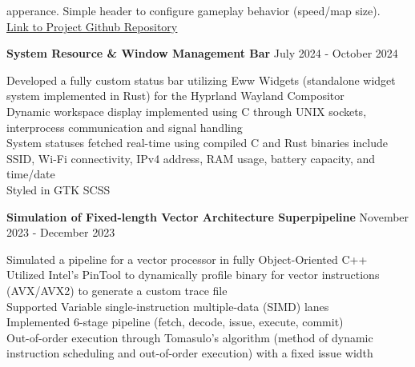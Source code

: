 \documentclass[letter,12pt]{article}
\begin{document}
apperance.
\textbullet \- Simple header to configure gameplay behavior (speed/map size).\\
\textbullet \- {\color{cyan}\underline{\href{https://github.com/DMGDy/termios-snake}{Link to Project Github Repository}}}
\begin{tcolorbox}
[colback=gray!25,
  leftrule=0pt,
  rightrule=0pt,
  sharp corners]
\noindent\textbf{System Resource \& Window Management Bar}
\hfill July 2024 - October 2024
\end{tcolorbox}
\noindent
\textbullet \- Developed a fully custom status bar utilizing Eww Widgets 
(standalone widget system implemented in Rust) for the Hyprland Wayland 
Compositor\\
\textbullet \- Dynamic workspace display implemented using C through UNIX sockets, interprocess 
communication and signal handling\\
\textbullet \- System statuses fetched real-time using compiled C and Rust binaries include
SSID, Wi-Fi connectivity, IPv4 address, RAM usage, battery capacity, and time/date\\
\textbullet \- Styled in GTK SCSS \\
\textbullet \- \href{https://github.com/DMGDy/eww-bar}
{}

\vspace{-.125cm}
\begin{tcolorbox}
[colback=gray!25,
  leftrule=0pt,
  rightrule=0pt,
  sharp corners]
\noindent\textbf{Simulation of Fixed-length Vector Architecture Superpipeline}
\hfill November 2023 - December 2023
\end{tcolorbox}
\noindent
\textbullet \- Simulated a pipeline for a vector processor in fully Object-Oriented C++\\
\textbullet \- Utilized Intel's PinTool to dynamically profile binary for vector instructions (AVX/AVX2) to generate a custom trace file\\
\textbullet \- Supported Variable single-instruction multiple-data (SIMD) lanes\\
\textbullet \- Implemented 6-stage pipeline (fetch, decode, issue, execute, commit)\\
\textbullet \- Out-of-order execution through Tomasulo's algorithm (method of dynamic
instruction scheduling and out-of-order execution)
with a fixed issue width\\
\end{document}
